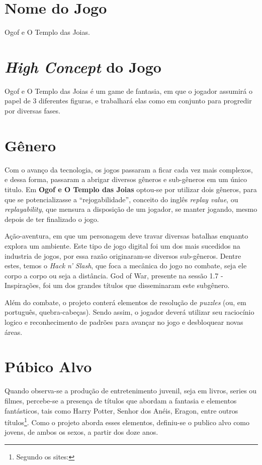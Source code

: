 \section{Nome do Jogo} Ogof e O Templo das Joias.

\section{\textit{High Concept} do Jogo} Ogof e O Templo das Joias é um game de
fantasia, em que o jogador assumirá o papel de 3 diferentes figuras, e trabalhará elas como
em conjunto para progredir por diversas fases.

\section{Gênero}
Com o avanço da tecnologia, os jogos passaram a ficar cada vez mais complexos, e dessa forma, passaram a abrigar diversos gêneros e sub-gêneros em um único titulo. Em \textbf{Ogof e O Templo das Joias} optou-se por utilizar dois gêneros, para que se potencializasse a ``rejogabilidade'', conceito do inglês \textit{replay value}, ou \textit{replayability}, que mensura a disposição de um jogador, se manter jogando, mesmo depois de ter finalizado o jogo.\cite{novak}

Ação-aventura, em que um personagem deve travar diversas batalhas enquanto explora um ambiente. Este tipo de jogo digital foi um dos mais sucedidos na industria de jogos\cite{novak}, por essa razão originaram-se diversos sub-gêneros. Dentre estes, temos o \textit{Hack n' Slash}, que foca a mecânica do jogo no combate, seja ele corpo a corpo ou seja a distância. God of War, presente  na sessão 1.7 - Inspirações, foi um dos grandes títulos que disseminaram este subgênero.

Além do combate, o projeto conterá elementos de resolução de \textit{puzzles} (ou, em português, quebra-cabeças). Sendo assim, o jogador deverá utilizar seu raciocínio logico e reconhecimento de padrões para avançar no jogo e desbloquear novas áreas.

\section{Púbico Alvo}

Quando observa-se a produção de entretenimento juvenil, seja em livros, series ou filmes, percebe-se a presença de títulos que abordam a fantasia e elementos fantásticos, tais como Harry Potter, Senhor dos Anéis, Eragon, entre outros títulos\footnote{Segundo os sites: }. Como o projeto aborda esses elementos, definiu-se o publico alvo como jovens, de ambos os sexos, a partir dos doze anos.

